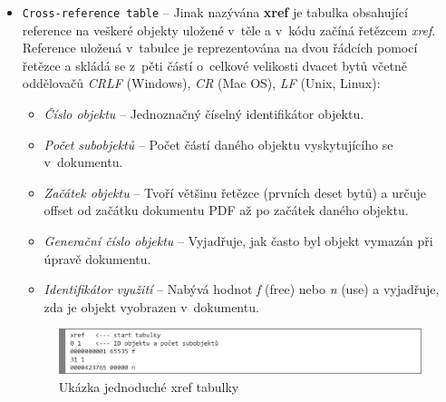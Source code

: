 \begin{itemize}
	\item \verb|Cross-reference table| -- Jinak nazývána \textbf{xref} je tabulka obsahující reference na veškeré objekty uložené v~těle a v~kódu začíná řetězcem \textit{xref}. Reference uložená v~tabulce je reprezentována na dvou řádcích pomocí řetězce a skládá se z~pěti částí o~celkové velikosti dvacet bytů včetně oddělovačů \textit{CRLF} (Windows), \textit{CR} (Mac OS), \textit{LF} (Unix, Linux):
	\begin{itemize}
		\item \textit{Číslo objektu} -- Jednoznačný číselný identifikátor objektu.
		\item \textit{Počet subobjektů} -- Počet částí daného objektu vyskytujícího se v~dokumentu.
		\item \textit{Začátek objektu} -- Tvoří většinu řetězce (prvních deset bytů) a určuje offset od začátku dokumentu PDF až po začátek daného objektu.
		\item \textit{Generační číslo objektu} -- Vyjadřuje, jak často byl objekt vymazán při úpravě dokumentu. 
		\item \textit{Identifikátor využití} -- Nabývá hodnot \textit{f} (free) nebo \textit{n} (use) a vyjadřuje, zda je objekt vyobrazen v~dokumentu.
	\end{itemize}
	\begin{figure}[h!]
	\centering
	\includegraphics[width=15cm]{img/pdf_xref}
	\caption{Ukázka jednoduché xref tabulky}
	\label{fig:pdf_xref}
	\end{figure}


\end{itemize}
